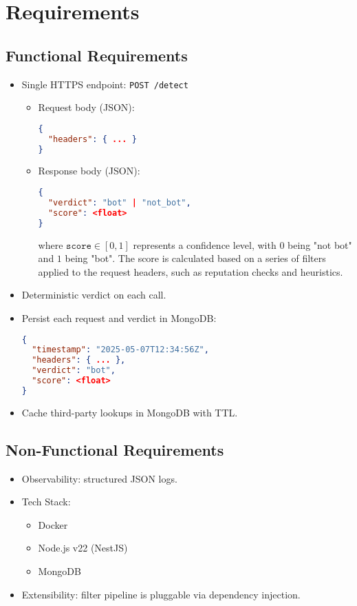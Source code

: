 \documentclass[12pt,a4paper]{article}
\begin{document}
\newpage 
\section{Requirements}

\subsection{Functional Requirements}
\begin{itemize}
  \item Single HTTPS endpoint: \lstinline|POST /detect|  
    \begin{itemize}
      \item Request body (JSON):
        \begin{lstlisting}[language=json,frame=none]
{
  "headers": { ... }
}
        \end{lstlisting}
      \item Response body (JSON):
        \begin{lstlisting}[language=json,frame=none]
{
  "verdict": "bot" | "not_bot",
  "score": <float>
}
        \end{lstlisting}
         where \(\texttt{score} \in [0,1]\) represents a confidence level, with \(0\) being "not bot" and \(1\) being "bot". The score is calculated based on a series of filters applied to the request headers, such as reputation checks and heuristics.
    \end{itemize}
  \item Deterministic verdict on each call.
  \item Persist each request and verdict in MongoDB:
    \begin{lstlisting}[language=json,frame=none]
{
  "timestamp": "2025-05-07T12:34:56Z",
  "headers": { ... },
  "verdict": "bot",
  "score": <float>
}
    \end{lstlisting}
  \item Cache third-party lookups in MongoDB with TTL.
\end{itemize}

\subsection{Non-Functional Requirements}
\begin{itemize}
  \item Observability: structured JSON logs.
  \item Tech Stack:
    \begin{itemize}
      \item Docker
      \item Node.js v22 (NestJS)
      \item MongoDB
    \end{itemize}
  \item Extensibility: filter pipeline is pluggable via dependency injection.
\end{itemize}
\end{document}

